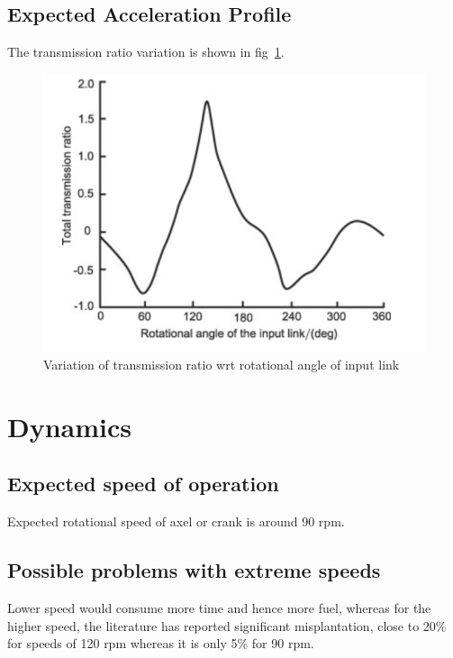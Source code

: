 \documentclass[a4paper,latin,center,onecolumn]{paper}
\begin{document}
        \subsection{Expected Acceleration Profile}
            The transmission ratio variation is shown in fig~\ref{fig:transmissionRatio}.
            
            \begin{figure}[hbt!]
                \centering
                \includegraphics[width=0.9\columnwidth]{Images/transmission_ratio.png}
                \caption{Variation of transmission ratio wrt rotational angle of input link}
                \label{fig:transmissionRatio}
            \end{figure}
        
    \section{Dynamics} 
        \subsection{Expected speed of operation}
            Expected rotational speed of axel or crank is around 90 rpm. 

        \subsection{Possible problems with extreme speeds}
            Lower speed would consume more time and hence more fuel, whereas for the higher speed, the literature has reported significant misplantation, close to 20\% for speeds of 120 rpm whereas it is only 5\% for 90 rpm.
\end{document}
